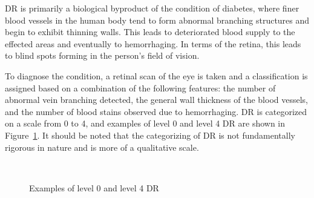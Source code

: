 \documentclass[letterpaper,12pt]{article}
\newcommand{\figref}[1]{Figure~\ref{#1}}
\begin{document}
DR is primarily a biological byproduct of the condition of diabetes, where finer blood vessels in the human body tend to form abnormal branching structures and begin to exhibit thinning walls. This leads to deteriorated blood supply to the effected areas and eventually to hemorrhaging. In terms of the retina, this leads to blind spots forming in the person's field of vision. 

To diagnose the condition, a retinal scan of the eye is taken and a classification is assigned based on a combination of the following features: the number of abnormal vein branching detected, the general wall thickness of the blood vessels, and the number of blood stains observed due to hemorrhaging. DR is categorized on a scale from 0 to 4, and examples of level 0 and level 4 DR are shown in \figref{marking_image}. It should be noted that the categorizing of DR is not fundamentally rigorous in nature and is more of a qualitative scale. 

\begin{figure}[htbp]
\begin{center}
  \ \ \ \ 
\caption{Examples of level 0 and level 4 DR}
\label{marking_image}
\end{center}
\end{figure}
\end{document}
